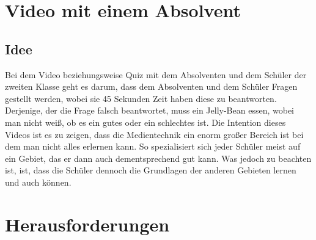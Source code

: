\section{Video mit einem Absolvent}
\subsection{Idee}
Bei dem Video beziehungsweise Quiz mit dem Absolventen und dem Schüler der zweiten Klasse geht es darum, dass dem Absolventen und dem Schüler Fragen gestellt werden, wobei sie 45 Sekunden Zeit haben diese zu beantworten. Derjenige, der die Frage falsch beantwortet, muss ein Jelly-Bean essen, wobei man nicht weiß, ob es ein gutes oder ein schlechtes ist. Die Intention dieses Videos ist es zu zeigen, dass die Medientechnik ein enorm großer Bereich ist bei dem man nicht alles erlernen kann. So spezialisiert sich jeder Schüler meist auf ein Gebiet, das er dann auch dementsprechend gut kann. Was jedoch zu beachten ist, ist, dass die Schüler dennoch die Grundlagen der anderen Gebieten lernen und auch können.
\section{Herausforderungen}
